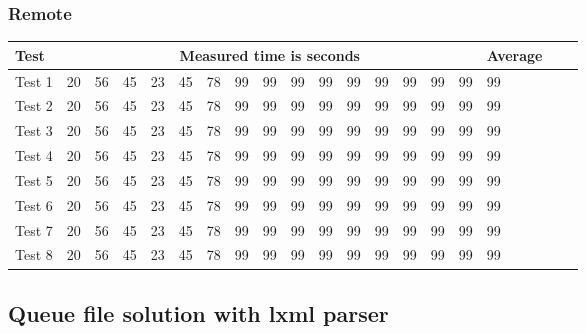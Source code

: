 \subsubsection{Remote}
\begin{center}
    \begin{tabular}{| l | l | l | l | l | l | l | l | l | l | l | l | l | l | l | l | l | l | l |}
    \hline
    Test & \multicolumn{15}{|c|}{Measured time is seconds} & Average \\ \hline
    Test 1 & 20 & 56 & 45 & 23 & 45 & 78 & 99 & 99 & 99 & 99 & 99 & 99 & 99 & 99 & 99 & 99 \\ \hline
    Test 2 & 20 & 56 & 45 & 23 & 45 & 78 & 99 & 99 & 99 & 99 & 99 & 99 & 99 & 99 & 99 & 99 \\ \hline
    Test 3 & 20 & 56 & 45 & 23 & 45 & 78 & 99 & 99 & 99 & 99 & 99 & 99 & 99 & 99 & 99 & 99 \\ \hline
    Test 4 & 20 & 56 & 45 & 23 & 45 & 78 & 99 & 99 & 99 & 99 & 99 & 99 & 99 & 99 & 99 & 99 \\ \hline
    Test 5 & 20 & 56 & 45 & 23 & 45 & 78 & 99 & 99 & 99 & 99 & 99 & 99 & 99 & 99 & 99 & 99 \\ \hline
    Test 6 & 20 & 56 & 45 & 23 & 45 & 78 & 99 & 99 & 99 & 99 & 99 & 99 & 99 & 99 & 99 & 99 \\ \hline
    Test 7 & 20 & 56 & 45 & 23 & 45 & 78 & 99 & 99 & 99 & 99 & 99 & 99 & 99 & 99 & 99 & 99 \\ \hline
    Test 8 & 20 & 56 & 45 & 23 & 45 & 78 & 99 & 99 & 99 & 99 & 99 & 99 & 99 & 99 & 99 & 99 \\ \hline
    \end{tabular}
\end{center}
\subsection{Queue file solution with lxml parser}
